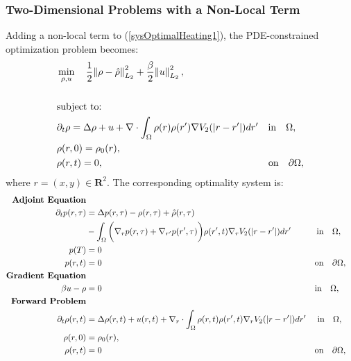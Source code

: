 \subsubsection*{Two-Dimensional Problems with a Non-Local Term}
Adding a non-local term to (\ref{sysOptimalHeating1}), the PDE-constrained optimization problem becomes:
\begin{align*}
&\min_{\rho,u} \quad \frac{1}{2}\norm{\rho- \hat{\rho}}_{L_2}^2 + \frac{\beta}{2} \norm{u}_{L_2}^2,\\
\\
&\text{subject to:}\\
&\partial_t \rho = \Delta \rho + {u} + \nabla \cdot \int_\Omega \rho(r) \rho(r') \nabla V_2(|r-r'|)dr'  \quad \text{in} \quad \Omega,
\\
&\rho(r,0)=\rho_0(r),
\\
& \rho(r,t)=0, \quad\quad\quad\quad\quad\quad\quad\quad\quad\quad\quad\quad\quad\quad\quad\quad \quad  \text{on} \quad \partial \Omega,
\end{align*}
where $r=(x,y) \in \mathbf{R}^2$.
The corresponding optimality system is:
\begin{align*}
\textbf{Adjoint Equation}  \\
\partial_t p(r,\tau) &= \Delta p(r,\tau) -\rho(r,\tau) +\hat{\rho}(r,\tau)\\
&-\int_\Omega \bigg( \nabla_r p(r,\tau) + \nabla_{r'} p(r',\tau) \bigg) \rho(r',t) \nabla_r V_2(|r-r'|)dr'  \quad\quad\quad   \text{in} \quad \Omega,\\
p(T) &= 0 \notag\\
p(r,t) &=0 \quad \quad \quad  \quad\quad\quad\quad\quad\quad\quad\quad\quad\quad\quad\quad\quad\quad\quad\quad\quad\quad\quad\quad \quad\ \ \ \text{on}\quad \partial\Omega, \notag\\
\textbf{Gradient Equation} \notag \\
\beta u  - \rho  &=0 \quad\quad\quad\quad \quad\quad\quad\quad\quad\quad\quad\quad\quad\quad\quad\quad\quad\quad\quad\quad\quad\quad\quad\quad\quad\text{in} \quad \Omega, \notag \\
\textbf{Forward Problem} \notag \\
\partial_t \rho(r,t) &= \Delta \rho(r,t) + u(r,t)+  \nabla_r \cdot \int_\Omega \rho(r,t) \rho(r',t) \nabla_r V_2(|r-r'|)dr' \quad \ \text{in} \quad \Omega,\\  
\rho(r,0)&=\rho_0(r), \notag \\
\rho(r,t) &=0 \quad\quad\quad \quad\quad\quad\quad\quad\quad\quad\quad\quad\quad\quad\quad\quad\quad \quad\quad\quad\quad\quad\quad\quad \ \ \ \text{on} \quad \partial \Omega, \notag
\end{align*}
